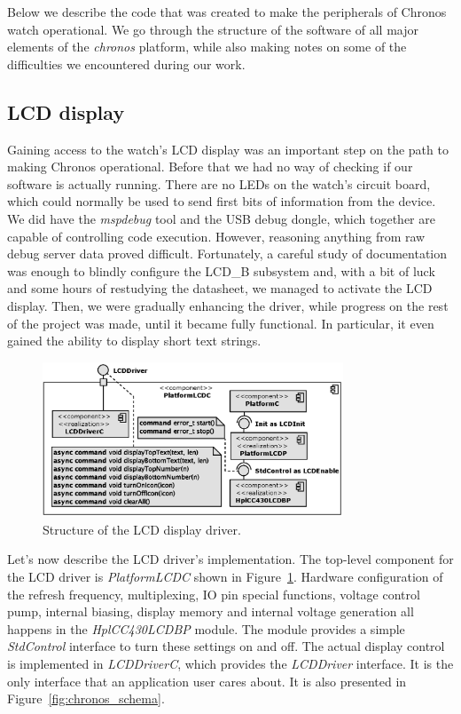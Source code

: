 Below we describe the code that was created to make the peripherals of Chronos watch operational. We go through the structure of the software of all major elements of the \emph{chronos} platform, while also making notes on some of the difficulties we encountered during our work.

\subsection{LCD display}
Gaining access to the watch's LCD display was an important step on the path to making Chronos operational.  Before that we had no way of checking if our software is actually running. There are no LEDs on the watch's circuit board, which could normally be used to send first bits of information from the device. We did have the \emph{mspdebug} tool and the USB debug dongle, which together are capable of controlling code execution. However, reasoning anything from raw debug server data proved difficult. Fortunately, a careful study of documentation was enough to blindly configure the LCD\_B subsystem and, with a bit of luck and some hours of restudying the datasheet, we managed to activate the LCD display. Then, we were gradually enhancing the driver, while progress on the rest of the project was made, until it became fully functional. In particular, it even gained the ability to display short text strings.

\begin{figure}[h]
  \centering
  \includegraphics[width=0.8\textwidth]{diagrams/platform_lcd_c.eps}
  \caption{Structure of the LCD display driver.}
  \label{fig:platformc_lcd_c}
\end{figure}
Let's now describe the LCD driver's implementation. The top-level component for the LCD driver is \emph{PlatformLCDC} shown in Figure~\ref{fig:platformc_lcd_c}.
Hardware configuration of the refresh frequency, multiplexing, IO pin special functions, voltage control pump, internal biasing, display memory and internal voltage generation all happens in the \emph{HplCC430LCDBP} module. The module provides a simple \emph{StdControl} interface to turn these settings on and off. The actual display control is implemented in \emph{LCDDriverC}, which provides the \emph{LCDDriver} interface. It is the only interface that an application user cares about. It is also presented in Figure~\ref{fig:chronos_schema}.

